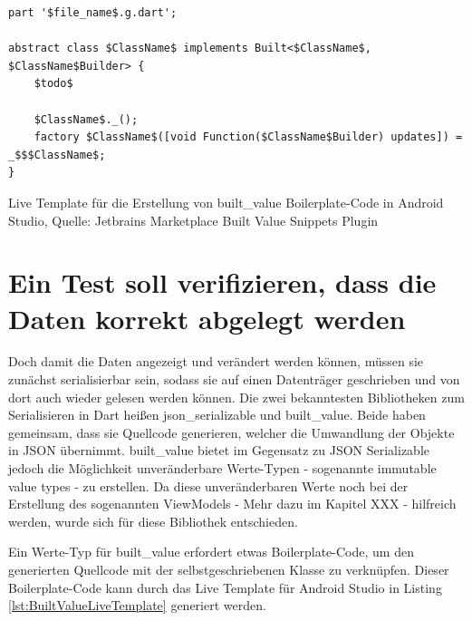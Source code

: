 \begin{listing}[h]
\begin{verbatim}
part '$file_name$.g.dart';

abstract class $ClassName$ implements Built<$ClassName$, $ClassName$Builder> {
    $todo$
    
    $ClassName$._();
    factory $ClassName$([void Function($ClassName$Builder) updates]) = _$$$ClassName$;
}
\end{verbatim} 
\caption[built_value Live Template]{Live Template für die Erstellung von built_value Boilerplate-Code in Android Studio, Quelle: Jetbrains Marketplace Built Value Snippets Plugin}
\label{lst:BuiltValueLiveTemplate}
\end{listing}


\section{Ein Test soll verifizieren, dass die Daten korrekt abgelegt werden}



Doch damit die Daten angezeigt und verändert werden können, müssen sie zunächst serialisierbar sein, sodass sie auf einen Datenträger geschrieben und von dort auch wieder gelesen werden können. 
Die zwei bekanntesten Bibliotheken zum Serialisieren in Dart heißen json_serializable und built_value.
Beide haben gemeinsam, dass sie Quellcode generieren, welcher die Umwandlung der Objekte in JSON übernimmt.
built_value bietet im Gegensatz zu JSON Serializable jedoch die Möglichkeit unveränderbare Werte-Typen -  sogenannte immutable value types -  zu erstellen. Da diese  unveränderbaren Werte noch bei der Erstellung des sogenannten ViewModels -  Mehr dazu im Kapitel XXX - hilfreich werden, wurde sich für diese Bibliothek entschieden.

Ein Werte-Typ für built_value erfordert etwas Boilerplate-Code,  um den generierten Quellcode mit der selbstgeschriebenen Klasse zu verknüpfen.  Dieser Boilerplate-Code kann durch das Live Template für Android Studio in Listing \ref{lst:BuiltValueLiveTemplate} generiert werden. 






